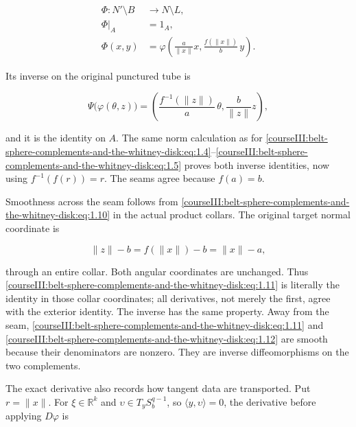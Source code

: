 \begin{equation}
\begin{aligned}
\Phi:N'\setminus B&\longrightarrow N\setminus L,\\
\Phi|_A&=1_A,\\
\Phi(x,y)&=\varphi\left(\frac a{\|x\|}x,\frac{f(\|x\|)}b\,y\right).
\end{aligned}
\label{courseIII:belt-sphere-complements-and-the-whitney-disk:eq:1.11}
\end{equation}

Its inverse on the original punctured tube is

\begin{equation}
\Psi\bigl(\varphi(\theta,z)\bigr)
=\left(\frac{f^{-1}(\|z\|)}a\,\theta,\frac b{\|z\|}z\right),
\label{courseIII:belt-sphere-complements-and-the-whitney-disk:eq:1.12}
\end{equation}

and it is the identity on \(A\). The same norm calculation as for \eqref{courseIII:belt-sphere-complements-and-the-whitney-disk:eq:1.4}--\eqref{courseIII:belt-sphere-complements-and-the-whitney-disk:eq:1.5} proves both inverse identities, now using \(f^{-1}(f(r))=r\). The seams agree because \(f(a)=b\).

Smoothness across the seam follows from \eqref{courseIII:belt-sphere-complements-and-the-whitney-disk:eq:1.10} in the actual product collars. The original target normal coordinate is

\begin{equation}
\|z\|-b=f(\|x\|)-b=\|x\|-a,
\label{courseIII:belt-sphere-complements-and-the-whitney-disk:eq:1.13}
\end{equation}

through an entire collar. Both angular coordinates are unchanged. Thus \eqref{courseIII:belt-sphere-complements-and-the-whitney-disk:eq:1.11} is literally the identity in those collar coordinates; all derivatives, not merely the first, agree with the exterior identity. The inverse has the same property. Away from the seam, \eqref{courseIII:belt-sphere-complements-and-the-whitney-disk:eq:1.11} and \eqref{courseIII:belt-sphere-complements-and-the-whitney-disk:eq:1.12} are smooth because their denominators are nonzero. They are inverse diffeomorphisms on the two complements.

The exact derivative also records how tangent data are transported. Put \(r=\|x\|\). For \(\xi\in\mathbb R^k\) and \(\upsilon\in T_yS_b^{q-1}\), so \(\langle y,\upsilon\rangle=0\), the derivative before applying \(D\varphi\) is


